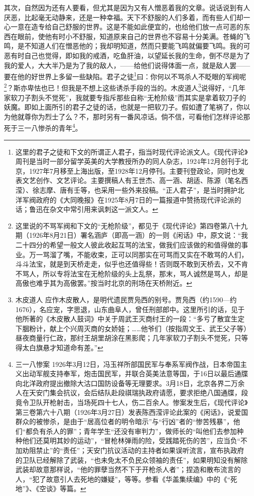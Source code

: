 \par 其次，自然因为还有人要看，但尤其是因为又有人憎恶着我的文章。说话说到有人厌恶，比起毫无动静来，还是一种幸福。天下不舒服的人们多着，而有些人们却一心一意在造专给自己舒服的世界。这是不能如此便宜的，也给他们放一点可恶的东西在眼前，使他有时小不舒服，知道原来自己的世界也不容易十分美满。苍蝇的飞鸣，是不知道人们在憎恶他的；我却明知道，然而只要能飞鸣就偏要飞鸣。我的可恶有时自己也觉得，即如我的戒酒，吃鱼肝油，以望延长我的生命，倒不尽是为了我的爱人，大大半乃是为了我的敌人，——给他们说得体面一点，就是敌人罢——要在他的好世界上多留一些缺陷。君子之徒\footnote{这里的君子之徒和下文的所谓正人君子，指当时现代评论派文人。《现代评论》周刊是当时一部分留学英美的大学教授所办的同人杂志，1924年12月创刊于北京，1927年7月移至上海出版，至1928年12月停刊。主要刊登政论，同时也发表文艺创作、文艺评论。主要撰稿人有王世杰、高一涵、胡适、陈源（笔名西滢）、徐志摩、唐有壬等，也采用一些外来投稿。“正人君子”，是当时拥护北洋军阀政府的《大同晚报》在1925年8月7日的一篇报道中赞扬现代评论派的话；鲁迅在杂文中常引用来讽刺这一派文人。}曰：你何以不骂杀人不眨眼的军阀呢\footnote{这里说的不骂军阀和下文的“无枪阶级”，都见于《现代评论》第四卷第八十九期（1926年8月21日）署名涵庐（即高一涵）的一则《闲话》中，原文说：“我二十四分的希望一般文人彼此收起互骂的法宝，做我们应该做的和值得做的事业。万一骂溜了嘴，不能收束，正可以同那实在可骂而又实在不敢骂的人们，斗斗法宝，就是到天桥走走，似乎也还值得些！否则既不敢到天桥去，又不肯不骂人，所以专将法宝在无枪阶级的头上乱祭，那末，骂人诚然是骂人，却是高傲也难乎其为高傲罢。”按当时北京的刑场在天桥附近。}？斯亦卑怯也已！但我是不想上这些诱杀手段的当的。木皮道人\footnote{木皮道人 应作木皮散人，是明代遗民贾凫西的别号。贾凫西（约1590—约1676），名应宠，字思退，山东曲阜人，曾任刑部郎中。这里所引的话，见于他所著的《木皮散人鼓词》中关于周武王灭商纣王的一段：“多亏了散宜生定下胭粉计，献上个兴周灭商的女娇娃；……他爷们（按指周文王、武王父子等）昼夜商量行仁政，那纣王胡里胡涂在黑影爬；几年家软刀子割头不觉死，只等得太白旗悬才知道命有差。”}说得好，“几年家软刀子割头不觉死”，我就要专指斥那些自称“无枪阶级”而其实是拿着软刀子的妖魔。即如上面所引的君子之徒的话，也就是一把软刀子。假如遭了笔祸了，你以为他就尊你为烈士了么？不，那时另有一番风凉话。倘不信，可看他们怎样评论那死于三一八惨杀的青年\footnote{三一八惨案 1926年3月12日，冯玉祥所部国民军与奉系军阀作战，日本帝国主义出动军舰支持奉军，炮击国民军，并联合英美法意等国，于16日以最后通牒向北洋政府提出撤除大沽口国防设备等无理要求。3月18日，北京各界二万余人在天安门集会抗议，会后结队赴段祺瑞执政府请愿，要求拒绝八国通牒，段竟令卫队开枪射击，当场死四十七人，伤二百余人。惨案发生后，《现代评论》第三卷第六十八期（1926年3月27日）发表陈西滢评论此案的《闲话》，说爱国群众的被惨杀，是由于“居高位者的明令暗示”与“行凶”者的“惨苦残暴”，他们“都负有杀人的罪”；青年学生“还没有审判力”，做师长的“叫他们去参加种种他们还莫明其妙的运动”，“冒枪林弹雨的险，受践踏死伤的苦”，应当负“不加劝阻禁止”的“责任”；天安门抗议活动的主持者如果误听流言，宣布执政府的卫队已经解除了武装，“也未免太不负民众领袖的责任”，如果明知没有解除武装却故意那样说，“他的罪孽当然不下于开枪杀人者”；捏造和散布流言的人，“犯了故意引人去死地的嫌疑”，等等。参看《华盖集续编》中的《“死地”》、《空谈》等篇。}。
